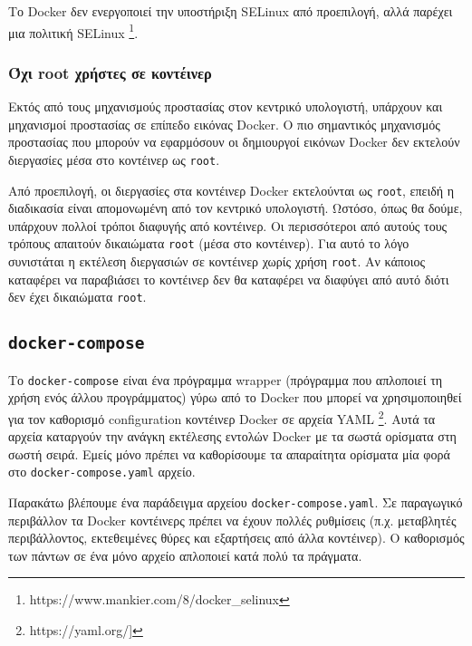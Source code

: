 Το \textlatin{Docker} δεν ενεργοποιεί την υποστήριξη \textlatin{SELinux} από
προεπιλογή, αλλά παρέχει μια πολιτική \textlatin{SELinux}
\footnote{\textlatin{https://www.mankier.com/8/docker\_selinux}}.

\subsubsection{Όχι \textlatin{root} χρήστες σε κοντέινερ}

Εκτός από τους μηχανισμούς προστασίας στον κεντρικό υπολογιστή, υπάρχουν και 
μηχανισμοί προστασίας σε επίπεδο εικόνας \textlatin{Docker}. Ο πιο σημαντικός
μηχανισμός προστασίας που μπορούν να εφαρμόσουν οι δημιουργοί εικόνων
\textlatin{Docker} δεν εκτελούν διεργασίες μέσα στο κοντέινερ ως
\texttt{\textlatin{root}}.

Από προεπιλογή, οι διεργασίες στα κοντέινερ \textlatin{Docker} εκτελούνται ως
\texttt{\textlatin{root}}, επειδή η διαδικασία είναι απομονωμένη από τον
κεντρικό υπολογιστή. Ωστόσο, όπως θα δούμε, υπάρχουν πολλοί τρόποι διαφυγής
από κοντέινερ. Οι περισσότεροι από αυτούς τους τρόπους απαιτούν δικαιώματα
\texttt{\textlatin{root}} (μέσα στο κοντέινερ). Για αυτό το λόγο συνιστάται η
εκτέλεση διεργασιών σε κοντέινερ χωρίς χρήση \texttt{\textlatin{root}}. Αν
κάποιος καταφέρει να παραβιάσει το κοντέινερ δεν θα καταφέρει να διαφύγει από
αυτό διότι δεν έχει δικαιώματα \texttt{\textlatin{root}}.

\subsection{\texttt{\textlatin{docker-compose}}}

Το \texttt{\textlatin{docker-compose}} είναι ένα πρόγραμμα \textlatin{wrapper}
(πρόγραμμα που απλοποιεί τη χρήση ενός άλλου προγράμματος) γύρω από το
\textlatin{Docker} που μπορεί να χρησιμοποιηθεί για τον καθορισμό
\textlatin{configuration} κοντέινερ \textlatin{Docker} σε αρχεία
\textlatin{YAML} \footnote{\textlatin{https://yaml.org/]}}. Αυτά τα αρχεία
καταργούν την ανάγκη εκτέλεσης εντολών \textlatin{Docker} με τα σωστά ορίσματα
στη σωστή σειρά. Εμείς μόνο πρέπει να καθορίσουμε τα απαραίτητα ορίσματα μία
φορά στο \texttt{\textlatin{docker-compose.yaml}} αρχείο.

Παρακάτω βλέπουμε ένα παράδειγμα αρχείου
\texttt{\textlatin{docker-compose.yaml}}. Σε παραγωγικό περιβάλλον τα
\textlatin{Docker} κοντέινερς πρέπει να έχουν πολλές ρυθμίσεις (π.χ.
μεταβλητές περιβάλλοντος, εκτεθειμένες θύρες και εξαρτήσεις από άλλα κοντέινερ).
Ο καθορισμός των πάντων σε ένα μόνο αρχείο απλοποιεί κατά πολύ τα πράγματα.



